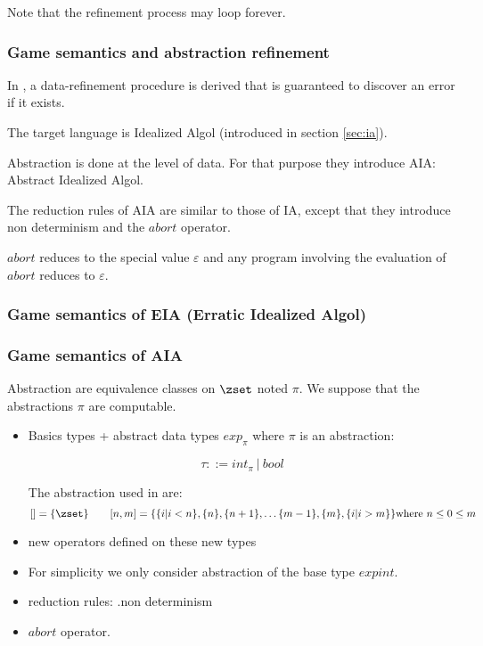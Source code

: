 Note that the refinement process may loop forever.


\subsubsection{Game semantics and abstraction refinement} In
\citep{DBLP:conf/sas/DimovskiGL05}, a data-refinement procedure is
derived that is guaranteed to discover an error if it exists.

The target language is Idealized Algol (introduced in section
\ref{sec:ia}).

Abstraction is done at the level of data. For that purpose they
introduce AIA: Abstract Idealized Algol.

The reduction rules of AIA are similar to those of IA, except that
they introduce non determinism and the $abort$ operator.

$abort$ reduces to the special value $\varepsilon$ and any program
involving the evaluation of $abort$ reduces to $\varepsilon$.


\subsubsection{Game semantics of EIA (Erratic Idealized Algol)}

\subsubsection{Game semantics of AIA} Abstraction are equivalence
classes on $\zset$ noted $\pi$. We suppose that the abstractions
$\pi$ are computable.

\begin{itemize}
\item Basics types + abstract data types $exp_\pi$ where $\pi$ is an
abstraction:

$$ \tau ::= int_\pi\ |\ bool$$

The abstraction used in \cite{DBLP:conf/sas/DimovskiGL05} are:
$$ [] = \{ \zset \} \qquad [n,m] = \{ \{ i | i<n \}, \{ n \}, \{n+1\},
\ldots \{ m-1\}, \{ m\}, \{ i | i > m \} \} \mbox{where } n \leq 0
\leq m$$


\item new operators defined on these new types

\item For simplicity we only consider abstraction of the base type
$expint$.

\item reduction rules: .non determinism

\item $abort$ operator.
\end{itemize}

